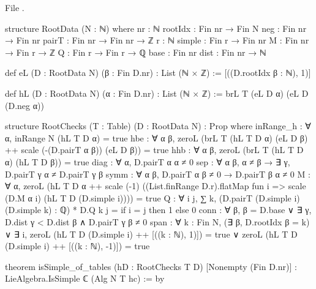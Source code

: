 \noindent File .
\begin{leancode}
structure RootData (N : ℕ) where
  nr : ℕ
  rootIdx : Fin nr → Fin N
  neg : Fin nr → Fin nr
  pairT : Fin nr → Fin nr → ℤ
  r : ℕ
  simple : Fin r → Fin nr
  M : Fin nr → Fin r → ℤ
  Q : Fin r → Fin r → ℚ
  base : Fin nr
  dist : Fin nr → ℕ

def eL (D : RootData N) (β : Fin D.nr) : List (ℕ × ℤ) := [((D.rootIdx β : ℕ), 1)]

def hL (D : RootData N) (α : Fin D.nr) : List (ℕ × ℤ) := brL T (eL D α) (eL D (D.neg α))

structure RootChecks (T : Table) (D : RootData N) : Prop where
  inRange_h : ∀ α, inRange N (hL T D α) = true
  hbe : ∀ α β, zeroL (brL T (hL T D α) (eL D β) ++ scale (-(D.pairT α β)) (eL D β)) = true
  hhb : ∀ α β, zeroL (brL T (hL T D α) (hL T D β)) = true
  diag : ∀ α, D.pairT α α ≠ 0
  sep : ∀ α β, α ≠ β → ∃ γ, D.pairT γ α ≠ D.pairT γ β
  symm : ∀ α β, D.pairT α β ≠ 0 → D.pairT β α ≠ 0
  M : ∀ α, zeroL (hL T D α ++ scale (-1)
    ((List.finRange D.r).flatMap fun i => scale (D.M α i) (hL T D (D.simple i)))) = true
  Q : ∀ i j, ∑ k, (D.pairT (D.simple i) (D.simple k) : ℚ) * D.Q k j = if i = j then 1 else 0
  conn : ∀ β, β = D.base ∨ ∃ γ, D.dist γ < D.dist β ∧ D.pairT γ β ≠ 0
  span : ∀ k : Fin N, (∃ β, D.rootIdx β = k) ∨
    ∃ i, zeroL (hL T D (D.simple i) ++ [((k : ℕ), 1)]) = true ∨
      zeroL (hL T D (D.simple i) ++ [((k : ℕ), -1)]) = true

theorem isSimple_of_tables (hD : RootChecks T D) [Nonempty (Fin D.nr)] :
    LieAlgebra.IsSimple ℂ (Alg N T hc) := by
\end{leancode}

